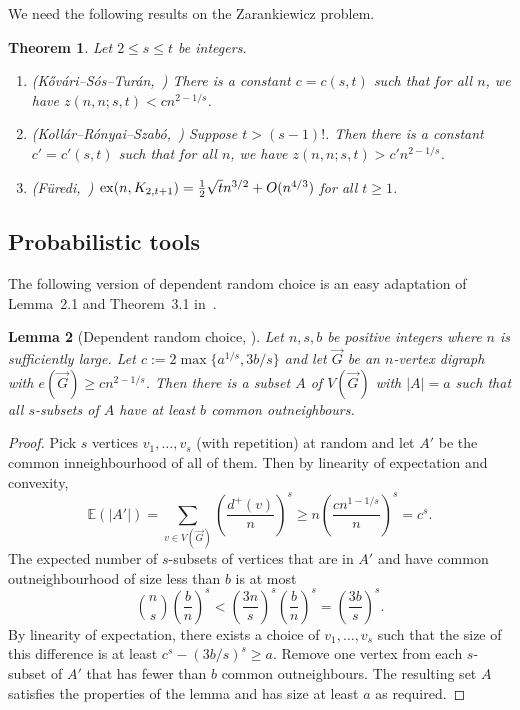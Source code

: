 \documentclass[a4paper, 12pt]{article}
\numberwithin{equation}{section}
\newtheorem{theorem}{Theorem}[section]
\newtheorem{lemma}[theorem]{Lemma}
\newcommand{\ova}[1]{\overrightarrow{#1}}
\begin{document}
We need the following results on the Zarankiewicz problem.

\begin{theorem}\label{th:KST}
    Let $2 \leq s \leq t$ be integers.
    \begin{enumerate}
        \item {\rm (K\H{o}v\'ari--S\'os--Tur\'an,~\cite{KovariSosTuran})} There is a constant $c=c(s,t)$ such that for all $n$, we have $z(n,n;s,t) < cn^{2-1/s}$.
        \item {\rm (Koll\'ar--R\'onyai--Szab\'o,~\cite{KollarRonyaiSzabo})} Suppose $t > (s-1)!$. Then there is a constant $c'=c'(s,t)$ such that for all $n$, we have $z(n,n;s,t) > c'n^{2-1/s}$.
        \item {\rm (F\"uredi,~\cite{Furedi})} ${\rm ex}(n,K_{2,t+1}) = \frac{1}{2}\sqrt{t}n^{3/2} + O(n^{4/3})$ for all $t \geq 1$.
    \end{enumerate}
\end{theorem}


\subsection{Probabilistic tools}

The following version of dependent random choice is an easy adaptation of Lemma~2.1 and Theorem~3.1 in~\cite{FoxSudakov}.

\begin{lemma}[Dependent random choice, \cite{FoxSudakov}]\label{lm:drc}
Let $n,s,b$ be positive integers where $n$ is sufficiently large.
Let $c := 2 \max\{a^{1/s},3b/s\}$ 
and let $\ova{G}$ be an $n$-vertex digraph with $e(\ova{G}) \geq cn^{2-1/s}$. %
Then there is a subset $A$ of $V(\ova{G})$ with $|A|=a$ such that all $s$-subsets of $A$ have at least $b$ common outneighbours.
\end{lemma}
\begin{proof}
    Pick $s$ vertices $v_1, \ldots, v_s$ (with repetition) at random and let $A'$ be the common inneighbourhood of all of them.
    Then by linearity of expectation and convexity, $$\mathbb E(|A'|)=\sum_{v \in V(\ova{G})} \left(\frac{d^{+}(v)}{n}\right)^s \ge n\left(\frac{cn^{1-1/s}}{n}\right)^s=c^s.$$
    The expected number of $s$-subsets of vertices that are in $A'$ and have common outneighbourhood of size less than $b$ is at most
    $${n \choose s} \left(\frac{b}{n}\right)^s< \left(\frac{3n}{s}\right)^s\left(\frac{b}{n}\right)^s = \left(\frac{3b}{s}\right)^s.$$
    By linearity of expectation, there exists a choice of $v_1, \ldots, v_s$ such that the  size of this difference is at least
    $c^s-(3b/s)^s \ge a$. Remove one vertex from each $s$-subset of $A'$ that has fewer than $b$ common outneighbours. The resulting set $A$ satisfies the properties of the lemma and has size at least $a$ as required. 
\end{proof}
\end{document}
